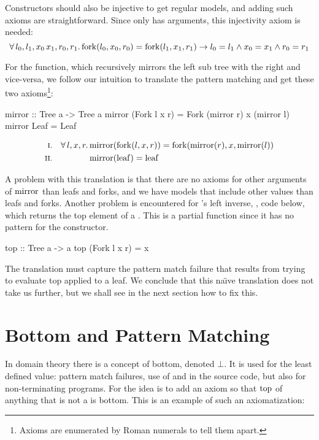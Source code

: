 Constructors should also be injective to get regular models, and
adding such axioms are straightforward. Since only  has
arguments, this injectivity axiom is needed:
\begin{equation*}
\forall \, l_0 , l_1 , x_0 \, x_1 , r_0 , r_1 . \, \mathrm{fork}(l_0,x_0,r_0) =
\mathrm{fork}(l_1,x_1,r_1) \rightarrow l_0 = l_1 \wedge x_0 = x_1 \wedge r_0 = r_1
\end{equation*}

For the  function, which recursively mirrors the left sub
tree with the right and vice-versa, we follow our intuition to
translate the pattern matching and get these two axioms\footnote
{Axioms are enumerated by Roman numerals to tell them apart.}:

\begin{code}
mirror :: Tree a -> Tree a
mirror (Fork l x r) = Fork (mirror r) x (mirror l)
mirror Leaf         = Leaf
\end{code}
\begin{align*}
\rom{1} && \faaa{l}{x}{r} & \fn{mirror}(\fn{fork}(l,x,r)) \eq \fn{fork}(\fn{mirror}(r),x,\fn{mirror}(l)) \\
\rom{2} &&                & \fn{mirror}(\fn{leaf}) \eq \fn{leaf}
\end{align*}

\noindent
A problem with this translation is that there are no axioms for other
arguments of $\mathrm{mirror}$ than leafs and forks, and we have models that
include other values than leafs and forks. Another problem is
encountered for 's left inverse, , code below,
which returns the top element of a . This is a partial
function since it has no pattern for the  constructor.

\begin{code}
top :: Tree a -> a
top (Fork l x r) = x
\end{code}

The translation must capture the pattern match failure that results
from trying to evaluate top applied to a leaf. We conclude that
this na\"{\i}ve translation does not take us further, but we shall see
in the next section how to fix this.

\section{Bottom and Pattern Matching}

In domain theory there is a concept of bottom, denoted $\bot$. It is
used for the least defined value: pattern match failures, use of
 and  in the source code, but also for
non-terminating programs.  
For  the idea is to add an axiom so that $\mathrm{top}$ of
anything that is not a  is bottom. This is an example of such
an axiomatization:

